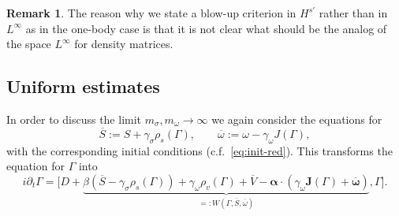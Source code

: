 \documentclass[10pt]{amsart}
\theoremstyle{definition}\newtheorem{defi}[theo]{Definition}\newtheorem{rema}[theo]{Remark}\newtheorem{exam}[theo]{Example}\newtheorem{exem}[theo]{Example}\newtheorem{nota}[theo]{Notation}
\newcommand\ii{{\ensuremath {\infty}}}
\begin{document}
\begin{rema}
The reason why we state a blow-up criterion in $H^{s'}$ rather than in $L^\ii$ as in the one-body case is that it is not clear what should be the analog of the space $L^\ii$ for density matrices.
\end{rema}

\subsection{Uniform estimates}

In order to discuss the limit $m_\sigma, m_\omega \to \infty$ we again consider the equations for
\begin{equation}\label{eq:def-Sbar-omegabar}
\overline{S}:=S+\gamma_\sigma \rho_s(\Gamma), \qquad \overline{\omega}:=\omega-\gamma_\omega J(\Gamma),
\end{equation}
with the corresponding initial conditions (c.f.~\eqref{eq:init-red}). This transforms the equation for $\Gamma$ into
\begin{equation}\label{eq:Gamma-red}
i\partial_t\Gamma = \Big[D+ \underbrace{{ \beta}\left(\overline{S} -\gamma_\sigma \rho_s(\Gamma)\right) + \gamma_\omega \rho_v(\Gamma) + \overline{V} - {\bm \alpha}\cdot(\gamma_\omega {\bm J}(\Gamma) +\overline{{\bm \omega}}) }_{=:W\left(\Gamma, \overline{S}, \overline{\omega}\right)}, \Gamma \Big].
\end{equation}
\end{document}
